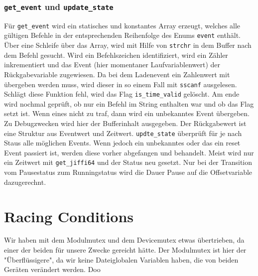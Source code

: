 \documentclass[
   draft=false
  ,paper=a4
  ,twoside=false
  ,fontsize=11pt
  ,headsepline
  ,BCOR10mm
  ,DIV11
  ,parskip=full+
]{scrartcl} %
\begin{document}
\subsubsection{\texttt{get\_event} und \texttt{update\_state}}
Für \texttt{get\_event} wird ein statisches und konstantes Array erzeugt, 
welches alle gültigen Befehle in der entsprechenden Reihenfolge des Enums 
\texttt{event} enthält. Über eine Schleife über das Array, wird mit Hilfe von
\texttt{strchr} in dem Buffer nach dem Befehl gesucht. Wird ein Befehlszeichen
identifiziert, wird ein Zähler inkrementiert und das Event (hier 
momentaner Laufvariablenwert) der Rückgabevariable zugewiesen. Da bei dem
Ladenevent ein Zahlenwert mit übergeben werden muss, wird dieser in so einem
Fall mit \texttt{sscanf} ausgelesen. Schlägt diese Funktion fehl, wird das 
Flag \texttt{is\_time\_valid} gelöscht.
Am ende wird nochmal geprüft, ob nur ein Befehl im String enthalten war 
und ob das Flag setzt ist. Wenn eines nicht zu traf, dann wird ein unbekanntes 
Event übergeben. Zu Debugzwecken wird hier der Bufferinhalt ausgegeben. 
Der Rückgabewert ist eine Struktur aus Eventwert und Zeitwert.
\texttt{updte\_state} überprüft für je nach Staus alle möglichen Events. Wenn
jedoch ein unbekanntes oder das ein reset Event passiert ist, werden diese 
vorher abgefangen und behandelt. Meist wird nur ein Zeitwert mit 
\texttt{get\_jiffi64} und der Status neu gesetzt. Nur bei der Transition vom 
Pausestatus zum Runningstatus wird die Dauer Pause auf die Offsetvariable 
dazugerechnt.


\section{Racing Conditions}
Wir haben mit dem Modulmutex und dem Devicemutex etwas übertrieben, da einer 
der beiden für unsere Zwecke gereicht hätte. Der Modulmutex ist hier der 
"{}Überflüssigere"{}, da wir keine Dateiglobalen Variablen haben, die von
beiden Geräten verändert werden. Doo
\end{document}
